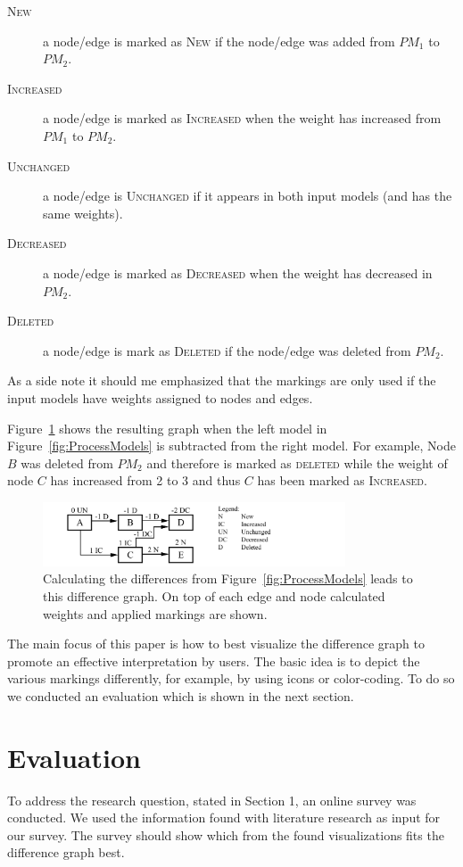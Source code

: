 \documentclass{llncs}
\begin{document}
\begin{description}
	\item[\textsc{New}] a node/edge is marked as \textsc{New} if the node/edge was added from $PM_1$ to $PM_2$.
	\item[\textsc{Increased}] a node/edge is marked as \textsc{Increased} when the weight has increased from $PM_1$ to $PM_2$.
	\item[\textsc{Unchanged}] a node/edge is \textsc{Unchanged} if it appears in both input models (and has the same weights).
	\item[\textsc{Decreased}] a node/edge is marked as \textsc{Decreased} when the weight has decreased in $PM_2$.
	\item[\textsc{Deleted}] a node/edge is mark as \textsc{Deleted} if the node/edge was deleted from $PM_2$.
\end{description}

As a side note it should me emphasized that the markings are only used if the input models have weights assigned to nodes and edges.

Figure~\ref{fig:DiffGraphCalculation} shows the resulting graph when the left model in Figure~\ref{fig:ProcessModels} is subtracted from the right model. For example, Node $B$ was deleted from $PM_2$ and therefore is marked as \textsc{deleted} while the weight of node $C$ has increased from 2 to 3 and thus $C$ has been marked as \textsc{Increased}. 

\begin{figure}
	\centering
	\includegraphics[width=0.8\textwidth]{Images/ResultGraph.PNG}
	\caption{Calculating the differences from Figure~\ref{fig:ProcessModels} leads to this difference graph. On top of each edge and node calculated weights and applied markings are shown.}
	\label{fig:DiffGraphCalculation}
\end{figure}

The main focus of this paper is how to best visualize the difference graph to promote an effective interpretation by users. The basic idea is to depict the various markings differently, for example, by using icons or color-coding. To do so we conducted an evaluation which is shown in the next section.


\section{Evaluation} %
\label{sec:Evaluation} %
To address the research question, stated in Section 1, an online survey was conducted. We used the information found with literature research as input for our survey. The survey should show which from the found visualizations fits the difference graph best.
\end{document}
